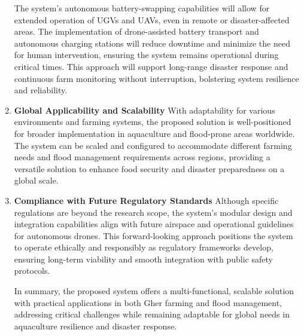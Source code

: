 \documentclass[conference]{IEEEtran}
\begin{document}
\begin{enumerate}
	The system’s autonomous battery-swapping capabilities will allow for extended operation of UGVs and UAVs, even in remote or disaster-affected areas. The implementation of drone-assisted battery transport and autonomous charging stations will reduce downtime and minimize the need for human intervention, ensuring the system remains operational during critical times. This approach will support long-range disaster response and continuous farm monitoring without interruption, bolstering system resilience and reliability.
	\item \textbf{Global Applicability and Scalability}
	With adaptability for various environments and farming systems, the proposed solution is well-positioned for broader implementation in aquaculture and flood-prone areas worldwide. The system can be scaled and configured to accommodate different farming needs and flood management requirements across regions, providing a versatile solution to enhance food security and disaster preparedness on a global scale.
	\item \textbf{Compliance with Future Regulatory Standards}
	Although specific regulations are beyond the research scope, the system’s modular design and integration capabilities align with future airspace and operational guidelines for autonomous drones. This forward-looking approach positions the system to operate ethically and responsibly as regulatory frameworks develop, ensuring long-term viability and smooth integration with public safety protocols.
	
	In summary, the proposed system offers a multi-functional, scalable solution with practical applications in both Gher farming and flood management, addressing critical challenges while remaining adaptable for global needs in aquaculture resilience and disaster response.

	
		

\end{enumerate}
\end{document}
